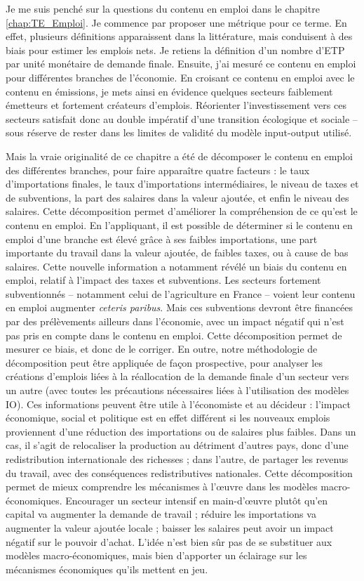 Je me suis penché sur la questions du contenu en emploi dans le chapitre \ref{chap:TE_Emploi}. Je commence par proposer une métrique pour ce terme. En effet, plusieurs définitions apparaissent dans la littérature, mais conduisent à des biais pour estimer les emplois nets. Je retiens la définition d’un nombre d’ETP par unité monétaire de demande finale.
Ensuite, j’ai mesuré ce contenu en emploi pour différentes branches de l’économie. En croisant ce contenu en emploi avec le contenu en émissions, je mets ainsi en évidence quelques secteurs faiblement émetteurs et fortement créateurs d’emplois. Réorienter l’investissement vers ces secteurs satisfait donc au double impératif d’une transition écologique et sociale – sous réserve de rester dans les limites de validité du modèle input-output utilisé.

Mais la vraie originalité de ce chapitre a été de décomposer le contenu en emploi des différentes branches, pour faire apparaître quatre facteurs : le taux d’importations finales, le taux d’importations intermédiaires, le niveau de taxes et de subventions, la part des salaires dans la valeur ajoutée, et enfin le niveau des salaires.
Cette décomposition permet d’améliorer la compréhension de ce qu’est le contenu en emploi. En l’appliquant, il est possible de déterminer si le contenu en emploi d’une branche est élevé grâce à ses faibles importations, une part importante du travail dans la valeur ajoutée, de faibles taxes, ou à cause de bas salaires.
Cette nouvelle information a notamment révélé un biais du contenu en emploi, relatif à l’impact des taxes et subventions. Les secteurs fortement subventionnés -- notamment celui de l'agriculture en France -- voient leur contenu en emploi augmenter \textit{ceteris paribus}. Mais ces subventions devront être financées par des prélèvements ailleurs dans l’économie, avec un impact négatif qui n’est pas pris en compte dans le contenu en emploi. Cette décomposition permet de mesurer ce biais, et donc de le corriger. 
En outre, notre méthodologie de décomposition peut être appliquée de façon prospective, pour analyser les créations d’emplois liées à la réallocation de la demande finale d’un secteur vers un autre (avec toutes les précautions nécessaires liées à l’utilisation des modèles IO). Ces informations peuvent être utile à l’économiste et au décideur : l’impact économique, social et politique est en effet différent si les nouveaux emplois proviennent d’une réduction des importations ou de salaires plus faibles. Dans un cas, il s’agit de relocaliser la production au détriment d’autres pays, donc d’une redistribution internationale des richesses ; dans l’autre, de partager les revenus du travail, avec des conséquences redistributives nationales.
Cette décomposition permet de mieux comprendre les mécanismes à l’œuvre dans les modèles macro-économiques. Encourager un secteur intensif en main-d’œuvre plutôt qu’en capital va augmenter la demande de travail ; réduire les importations va augmenter la valeur ajoutée locale ; baisser les salaires peut avoir un impact négatif sur le pouvoir d’achat. L’idée n’est bien sûr pas de se substituer aux modèles macro-économiques, mais bien d’apporter un éclairage sur les mécanismes économiques qu’ils mettent en jeu.

